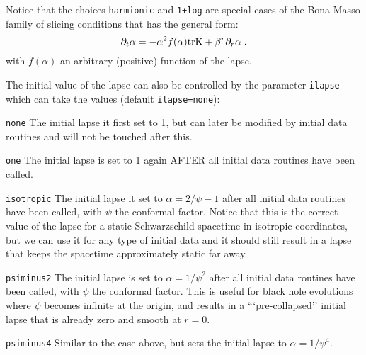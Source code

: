 \documentclass[12pt]{article}
\begin{document}
\vspace{3mm}

Notice that the choices \texttt{harmionic} and \texttt{1+log} are special cases
of the Bona-Masso family of slicing conditions that has the general form:
\begin{equation}
\partial_t \alpha = - \alpha^2 f(\alpha) {\rm trK} + \beta^r \partial_r \alpha\; .
\end{equation}
with $f(\alpha)$ an arbitrary (positive) function of the lapse.
 
\vspace{5mm}

The initial value of the lapse can also be controlled by the parameter
\texttt{ilapse} which can take the values (default
\texttt{ilapse=none}):

\begin{list}{}{
\setlength{\leftmargin}{35mm}
\setlength{\labelsep}{10mm}
\setlength{\labelwidth}{20mm}}

\item[\texttt{none}] The initial lapse it first set to 1, but can
  later be modified by initial data routines and will not be touched
  after this.

\item[\texttt{one}] The initial lapse is set to 1 again AFTER all
  initial data routines have been called.

\item[\texttt{isotropic}] The initial lapse it set to
  $\alpha=2/\psi-1$ after all initial data routines have been called,
  with $\psi$ the conformal factor.  Notice that this is the correct
  value of the lapse for a static Schwarzschild spacetime in isotropic
  coordinates, but we can use it for any type of initial data and it
  should still result in a lapse that keeps the spacetime
  approximately static far away.

\item[\texttt{psiminus2}] The initial lapse is set to
  $\alpha=1/\psi^2$ after all initial data routines have been called,
  with $\psi$ the conformal factor. This is useful for black hole
  evolutions where $\psi$ becomes infinite at the origin, and results
  in a ```pre-collapsed'' initial lapse that is already zero and
  smooth at $r=0$.

\item[\texttt{psiminus4}] Similar to the case above, but sets the
  initial lapse to $\alpha=1/\psi^4$.

\end{list}
\end{document}
